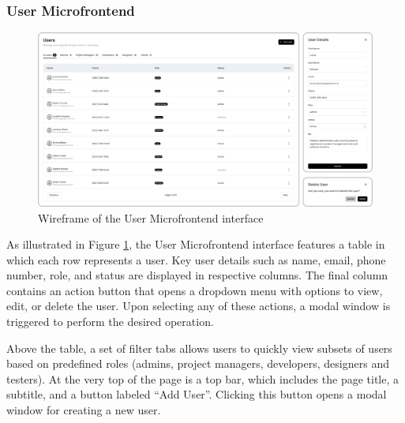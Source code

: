 \subsubsection*{User Microfrontend}
\begin{figure}[h]
\centerline{\includegraphics[width=1\textwidth]{images/wireframes/user-microfrontend.png}}
\caption[User Microfrontend wireframe]{Wireframe of the User Microfrontend interface}
\label{fig:user-wireframe}
\end{figure}
As illustrated in Figure \ref{fig:user-wireframe}, the User Microfrontend interface features a table in which each row represents a user. Key user details such as name, email, phone number, role, and status are displayed in respective columns. The final column contains an action button that opens a dropdown menu with options to view, edit, or delete the user. Upon selecting any of these actions, a modal window is triggered to perform the desired operation.

Above the table, a set of filter tabs allows users to quickly view subsets of users based on predefined roles (admins, project managers, developers, designers and testers). At the very top of the page is a top bar, which includes the page title, a subtitle, and a button labeled ``Add User''. Clicking this button opens a modal window for creating a new user.

